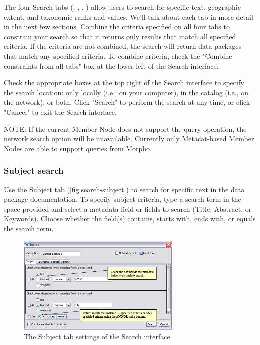 The four Search tabs (,
, ,
) allow users to search for specific text,
geographic extent, and taxonomic ranks and values. We'll talk about each
tab in more detail in the next few sections. Combine the criteria
specified on all four tabs to constrain your search so that it returns
only results that match all specified criteria. If the criteria are not
combined, the search will return data packages that match any specified
criteria. To combine criteria, check the "Combine constraints from all
tabs" box at the lower left of the Search interface. 

Check the appropriate boxes at the top right of the Search interface to
specify the search location: only locally (i.e., on your computer), in
the catalog (i.e., on the network), or both.  Click "Search" to
perform the search at any time, or click "Cancel" to exit the Search
interface.

NOTE: If the current Member Node does not support the query operation, 
the network search option will be unavailable. Currently only Metacat-based 
Member Nodes are able to support queries from Morpho.

\subsubsection[Subject]{Subject search} \label{sec:search-subject}

Use the Subject tab (\autoref{fig:search-subject}) to search for
specific text in the data package documentation. To specify subject
criteria, type a search term in the space provided and select a metadata
field or fields to search (Title, Abstract, or Keywords). Choose whether
the field(s) contains, starts with, ends with, or equals the search
term. 

\begin{figure}
  \centering
    \includegraphics[width=0.7\textwidth]{images/search-subject.jpg}
  \caption{The Subject tab settings of the Search interface.}
  \label{fig:search-subject}
\end{figure}

